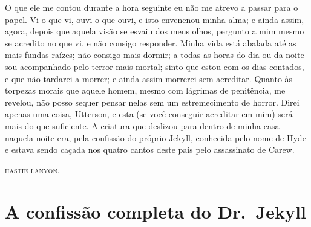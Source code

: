 O que ele me contou durante a hora seguinte eu não me atrevo a passar
para o papel.  Vi o que vi, ouvi o que ouvi, e isto envenenou minha
alma; e ainda assim, agora, depois que aquela visão se esvaiu dos meus
olhos, pergunto a mim mesmo se acredito no que vi, e não consigo
responder.  Minha vida está abalada até as mais fundas raízes; não
consigo mais dormir; a todas as horas do dia ou da noite sou
acompanhado pelo terror mais mortal; sinto que estou com os dias
contados, e que não tardarei a morrer; e ainda assim morrerei sem
acreditar.  Quanto às torpezas morais que aquele homem, mesmo com
lágrimas de penitência, me revelou, não posso sequer pensar nelas sem
um estremecimento de horror.  Direi apenas uma coisa, Utterson, e esta
(se você conseguir acreditar em mim) será mais do que suficiente.  A
criatura que deslizou para dentro de minha casa naquela noite era, pela
confissão do próprio Jekyll, conhecida pelo nome de Hyde e estava sendo
caçada nos quatro cantos deste país pelo assassinato de Carew.

\textsc{hastie lanyon}.


\chapter[A confissão completa do Dr.~Jekyll]{A confissão completa do Dr.~Jekyll}

